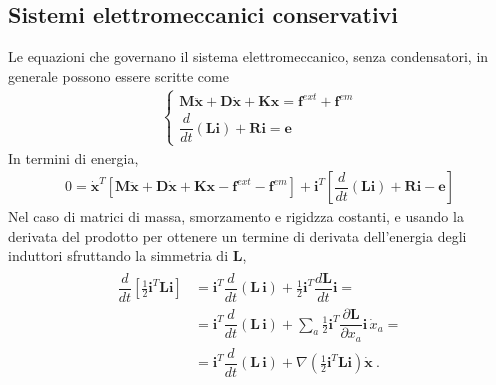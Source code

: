 \documentclass[letterpaper,10pt,english]{jupyterBook}
\begin{document}
\subsection{Sistemi elettromeccanici conservativi}
\label{\detokenize{ch/circuits-electromechanic:sistemi-elettromeccanici-conservativi}}
\sphinxAtStartPar
Le equazioni che governano il sistema elettromeccanico, senza condensatori, in generale possono essere scritte come
\begin{equation*}
\begin{split}\begin{cases}
 \mathbf{M} \ddot{\mathbf{x}} + \mathbf{D} \dot{\mathbf{x}} + \mathbf{K} \mathbf{x} = \mathbf{f}^{ext} + \mathbf{f}^{em} \\
 \dfrac{d}{dt} \left( \mathbf{L} \mathbf{i} \right) + \mathbf{R} \mathbf{i} = \mathbf{e}
\end{cases}\end{split}
\end{equation*}
\sphinxAtStartPar
In termini di energia,
\begin{equation*}
\begin{split}
0 = \dot{\mathbf{x}}^T \left[ \mathbf{M} \ddot{\mathbf{x}} + \mathbf{D} \dot{\mathbf{x}} + \mathbf{K} \mathbf{x} - \mathbf{f}^{ext} - \mathbf{f}^{em} \right] + \mathbf{i}^T \left[ \dfrac{d}{dt} \left( \mathbf{L} \mathbf{i} \right) + \mathbf{R} \mathbf{i} - \mathbf{e} \right]
\end{split}
\end{equation*}
\sphinxAtStartPar
Nel caso di matrici di massa, smorzamento e rigidzza costanti, e usando la derivata del prodotto per ottenere un termine di derivata dell’energia degli induttori sfruttando la simmetria di \(\mathbf{L}\),
\begin{equation}\label{equation:ch/circuits-electromechanic:classical-electromagnetism:circuits-electromechanic:energy-mech-0}
\begin{split} \begin{aligned}
\dfrac{d}{dt} \left[ \frac{1}{2} \mathbf{i}^T \mathbf{L} \mathbf{i} \right] 
  & = \mathbf{i}^T \dfrac{d}{dt} \left( \mathbf{L} \, \mathbf{i} \right) + \frac{1}{2} \mathbf{i}^T \dfrac{d \mathbf{L}}{dt} \mathbf{i} = \\
  & = \mathbf{i}^T \dfrac{d}{dt} \left( \mathbf{L} \, \mathbf{i} \right) + \sum_{a} \frac{1}{2} \mathbf{i}^T \dfrac{\partial \mathbf{L}}{\partial x_a} \mathbf{i} \, \dot{x}_a = \\
  & = \mathbf{i}^T \dfrac{d}{dt} \left( \mathbf{L} \, \mathbf{i} \right) + \nabla \left( \frac{1}{2} \mathbf{i}^T \mathbf{L} \mathbf{i} \right) \dot{\mathbf{x}}  \ .
\end{aligned}\end{split}
\end{equation}
\end{document}
